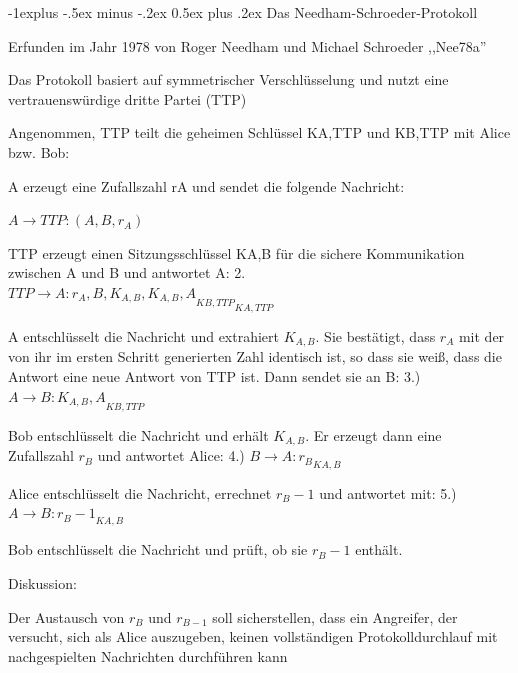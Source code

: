 \documentclass[a4paper]{article}
\makeatletter
\renewcommand{\subsection}{\@startsection{subsection}{2}{0mm}%
 {-1explus -.5ex minus -.2ex}%
 {0.5ex plus .2ex}%
 {\normalfont\normalsize\bfseries}}
\makeatother
\begin{document}
\begin{multicols}{3}
      \subsection{Das Needham-Schroeder-Protokoll}
      \begin{itemize*}
            \item Erfunden im Jahr 1978 von Roger Needham und Michael Schroeder ,,Nee78a''
            \item Das Protokoll basiert auf symmetrischer Verschlüsselung und nutzt eine vertrauenswürdige dritte Partei (TTP)
            \item Angenommen, TTP teilt die geheimen Schlüssel KA,TTP und KB,TTP mit Alice bzw. Bob:
            \begin{itemize*}
                  \item A erzeugt eine Zufallszahl rA und sendet die folgende Nachricht:
                  \begin{enumerate*}
                        \item $A\rightarrow TTP: (A, B, r_A)$
                  \end{enumerate*}
                  \item TTP erzeugt einen Sitzungsschlüssel KA,B für die sichere Kommunikation zwischen A und B und antwortet A: 2. $TTP\rightarrow A:{r_A, B, K_{A,B}, {K_{A,B}, A}_{{K}{B,TTP}}}_{{K}{A,TTP}}$
                  \item A entschlüsselt die Nachricht und extrahiert $K_{A,B}$. Sie bestätigt, dass $r_A$ mit der von ihr im ersten Schritt generierten Zahl identisch ist, so dass sie weiß, dass die Antwort eine neue Antwort von TTP ist. Dann sendet sie an B: 3.) $A\rightarrow B:{K_{A,B}, A}_{{K}{B,TTP}}$
                  \item Bob entschlüsselt die Nachricht und erhält $K_{A,B}$. Er erzeugt dann eine Zufallszahl $r_B$ und antwortet Alice: 4.) $B\rightarrow A:{r_B}_{{K}{A,B}}$
                  \item Alice entschlüsselt die Nachricht, errechnet $r_{B}-1$ und antwortet mit: 5.) $A\rightarrow B:{r_B-1}_{{K}{A,B}}$
                  \item Bob entschlüsselt die Nachricht und prüft, ob sie $r_B-1$ enthält.
            \end{itemize*}
            \item Diskussion:
            \begin{itemize*}
                  \item Der Austausch von $r_B$ und $r_{B-1}$ soll sicherstellen, dass ein Angreifer, der versucht, sich als Alice auszugeben, keinen vollständigen Protokolldurchlauf mit nachgespielten Nachrichten durchführen kann

\end{itemize*}
\end{itemize*}
\end{multicols}
\end{document}
